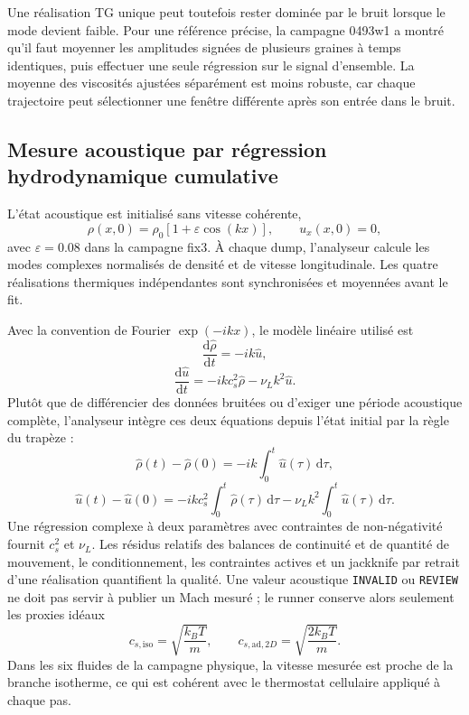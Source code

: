 \documentclass[11pt,a4paper]{article}
\begin{document}
Une réalisation TG unique peut toutefois rester dominée par le bruit lorsque le mode devient faible. Pour une référence précise, la campagne 0493w1 a montré qu'il faut moyenner les amplitudes signées de plusieurs graines à temps identiques, puis effectuer une seule régression sur le signal d'ensemble. La moyenne des viscosités ajustées séparément est moins robuste, car chaque trajectoire peut sélectionner une fenêtre différente après son entrée dans le bruit.

\subsection{Mesure acoustique par régression hydrodynamique cumulative}

L'état acoustique est initialisé sans vitesse cohérente,
\begin{equation}
  \rho(x,0)=\rho_0\left[1+\varepsilon\cos(kx)\right],
  \qquad u_x(x,0)=0,
\end{equation}
avec $\varepsilon=0.08$ dans la campagne fix3. À chaque dump, l'analyseur calcule les modes complexes normalisés de densité et de vitesse longitudinale. Les quatre réalisations thermiques indépendantes sont synchronisées et moyennées avant le fit.

Avec la convention de Fourier $\exp(-ikx)$, le modèle linéaire utilisé est
\begin{equation}
  \frac{\mathrm d\widehat\rho}{\mathrm dt}=-ik\widehat u,
\end{equation}
\begin{equation}
  \frac{\mathrm d\widehat u}{\mathrm dt}
  =-ikc_s^2\widehat\rho-\nu_Lk^2\widehat u.
\end{equation}
Plutôt que de différencier des données bruitées ou d'exiger une période acoustique complète, l'analyseur intègre ces deux équations depuis l'état initial par la règle du trapèze :
\begin{equation}
  \widehat\rho(t)-\widehat\rho(0)
  =-ik\int_0^t\widehat u(\tau)\,\mathrm d\tau,
\end{equation}
\begin{equation}
  \widehat u(t)-\widehat u(0)
  =-ikc_s^2\int_0^t\widehat\rho(\tau)\,\mathrm d\tau
  -\nu_Lk^2\int_0^t\widehat u(\tau)\,\mathrm d\tau.
\end{equation}
Une régression complexe à deux paramètres avec contraintes de non-négativité fournit $c_s^2$ et $\nu_L$. Les résidus relatifs des balances de continuité et de quantité de mouvement, le conditionnement, les contraintes actives et un jackknife par retrait d'une réalisation quantifient la qualité. Une valeur acoustique \texttt{INVALID} ou \texttt{REVIEW} ne doit pas servir à publier un Mach mesuré ; le runner conserve alors seulement les proxies idéaux
\begin{equation}
  c_{s,\mathrm{iso}}=\sqrt{\frac{k_BT}{m}},
  \qquad
  c_{s,\mathrm{ad},2D}=\sqrt{\frac{2k_BT}{m}}.
\end{equation}
Dans les six fluides de la campagne physique, la vitesse mesurée est proche de la branche isotherme, ce qui est cohérent avec le thermostat cellulaire appliqué à chaque pas.
\end{document}

